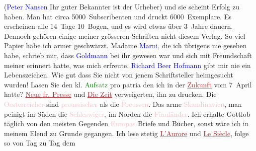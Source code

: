                         (\textcolor{blue}{Peter Nansen}{}\ledrightnote{\textcolor{blue}{Peter Nansen}} Ihr guter Bekannter ist der
                    Urheber) und sie scheint Erfolg zu haben. Man hat circa 5000 Subscribenten und
                    druckt 6000 Exemplare. Es erscheinen alle 14 Tage 10 Bogen, und es wird etwas
                    über 3 Jahre dauern. Dennoch gehören einige meiner grösseren Schriften nicht
                    diesem Verlag. So viel Papier habe ich armer geschwärzt.\pend
           \pstart
           Madame \textcolor{blue}{Marni}{}\ledrightnote{\textcolor{blue}{Jeanne Marni}}, die ich übrigens nie gesehen
                    habe, schrieb mir, dass \textcolor{blue}{Goldmann}{}\ledrightnote{\textcolor{blue}{Paul Goldmann}} bei ihr
                    gewesen war und sich mit Freundschaft meiner erinnert hatte, was mich erfreute.
                        \textcolor{blue}{Richard Beer Hofmann}{}\ledrightnote{\textcolor{blue}{Richard Beer-Hofmann}} gibt mir nie {\pb}ein Lebenszeichen.\pend
           \pstart
           Wie gut dass Sie nicht von jenem Schriftsteller heimgesucht wurden! Lasen Sie den
                    kl. \textcolor{green}{Aufsatz}{} pro patria den
                    ich in der \textcolor{brown}{\uline{Zukunft}}{}\ledrightnote{\textcolor{brown}{Die Zukunft}} vom 7 April hatte?
                        \textcolor{brown}{\uline{Neue fr. Presse}}{}\ledrightnote{\textcolor{brown}{Neue Freie Presse}} und \textcolor{brown}{\uline{Die Zeit}}{}\ledrightnote{\textcolor{brown}{Die Zeit. Wiener Wochenschrift}} verweigerten, ihn zu drucken.
                    Die \textcolor{pink}{Oesterreicher}{}\ledrightnote{\textcolor{pink}{Österreich}}
               sind \textcolor{pink}{preussischer}{}\ledrightnote{\textcolor{pink}{Preußen}} als die \textcolor{pink}{Preussen}{}\ledrightnote{\textcolor{pink}{Preußen}}. Das arme \textcolor{pink}{Skandinavien}{}\ledrightnote{\textcolor{pink}{Skandinavien}}, man peinigt im Süden die \textcolor{pink}{Schleswiger}{}\ledrightnote{\textcolor{pink}{Südschleswig}}, im Norden die \textcolor{pink}{Finnländer}{}\ledrightnote{\textcolor{pink}{Finnland}}.\pend
           \pstart
           Ich erhalte Gottlob täglich von den meisten Gegenden \textcolor{pink}{Europas}{}\ledrightnote{\textcolor{pink}{Europa}} Briefe und Bücher, sonst wäre ich in meinem Elend zu Grunde
                    gegangen. Ich lese stetig \textcolor{brown}{\uline{L’Aurore}}{}\ledrightnote{\textcolor{brown}{L’Aurore}} und \textcolor{brown}{\uline{Le Siècle}}{}\ledrightnote{\textcolor{brown}{Le Siècle}}, folge so von Tag zu Tag dem
